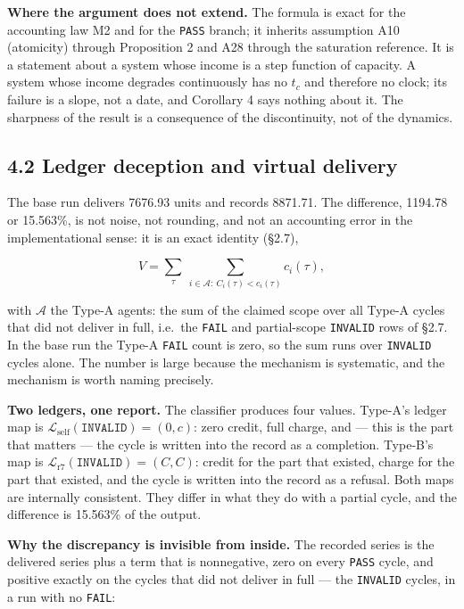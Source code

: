 \documentclass[11pt,a4paper]{article}
\begin{document}
\textbf{Where the argument does not extend.} The formula is exact for the accounting law
M2 and for the \texttt{PASS} branch; it inherits assumption A10 (atomicity) through
Proposition 2 and A28 through the saturation reference. It is a statement about a
system whose income is a step function of capacity. A system whose income degrades
continuously has no \(t_c\) and therefore no clock; its failure is a slope, not a
date, and Corollary 4 says nothing about it. The sharpness of the result is a
consequence of the discontinuity, not of the dynamics.

\subsection{4.2 Ledger deception and virtual delivery}\label{ledger-deception-and-virtual-delivery}

The base run delivers 7676.93 units and records 8871.71. The difference, 1194.78 or
15.563\%, is not noise, not rounding, and not an accounting error in the
implementational sense: it is an exact identity (§2.7),

\[
V=\sum_{\tau}\ \sum_{i\in\mathcal{A}:\ C_i(\tau)<c_i(\tau)} c_i(\tau),
\]

with \(\mathcal{A}\) the Type-A agents: the sum of the claimed scope over all
Type-A cycles that did not deliver in full,
i.e.~the \texttt{FAIL} and partial-scope \texttt{INVALID} rows of §2.7. In the base run the
Type-A \texttt{FAIL} count is zero, so the sum runs over \texttt{INVALID} cycles alone. The
number is large because the mechanism is systematic, and the mechanism is worth
naming precisely.

\textbf{Two ledgers, one report.} The classifier produces four values. Type-A's ledger
map is \(\mathcal{L}_{\mathrm{self}}(\texttt{INVALID})=(0,c)\): zero credit, full
charge, and --- this is the part that matters --- the cycle is written into the record
as a completion. Type-B's map is \(\mathcal{L}_{\mathrm{r7}}(\texttt{INVALID})=(C,C)\):
credit for the part that existed, charge for the part that existed, and the cycle
is written into the record as a refusal. Both maps are internally consistent. They
differ in what they do with a partial cycle, and the difference is 15.563\% of the
output.

\textbf{Why the discrepancy is invisible from inside.} The recorded series is the
delivered series plus a term that is nonnegative, zero on every \texttt{PASS} cycle, and
positive exactly on the cycles that did not deliver in full --- the \texttt{INVALID}
cycles, in a run with no \texttt{FAIL}:
\end{document}
